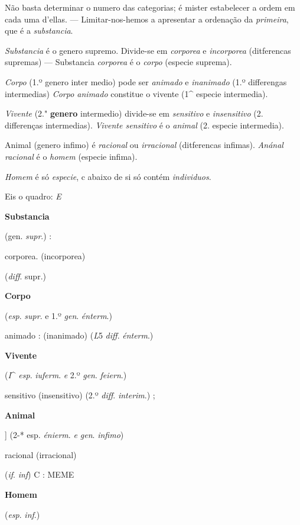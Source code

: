 
 
Não basta determinar o numero das categorias; é mister estabelecer a ordem em cada uma d'ellas. --- Limitar-nos-hemos a apresentar a ordenação da \emph{primeira}, que é a \emph{substancia}.

\emph{Substancia} é o genero supremo. Divide-se em \emph{corporea} e \emph{incorporea} (ditferencas supremas) --- Substancia \emph{corporea} é o \emph{corpo} (especie suprema).

\emph{Corpo} (1.º genero inter medio) pode ser \emph{animado} e \emph{inanimado} (1.º differengas intermedias) \emph{Corpo animado} constitue o vivente (1\textasciicircum{} especie intermedia).

\emph{Vivente} (2." \textbf{genero} intermedio) divide-se em \emph{sensitivo} e \emph{insensitivo} (2. differenças intermedias). \emph{Vivente sensitivo} é o \emph{animal} (2. especie intermedia).

Animal (genero infimo) é \emph{racional} ou \emph{irracional} (ditferencas infimas). \emph{Anánal racional} é o \emph{homem} (especie infima).

\emph{Homem} é só \emph{especie}, c abaixo de si só contém \emph{individuos}.

Eis o quadro: \emph{E}

\textbf{Substancia}

(gen. \emph{supr}.) \textbar{} :

corporea. (incorporea)

(\emph{diff}. supr.)

\textbf{Corpo}

(\emph{esp}. \emph{supr}. e 1.º \emph{gen}. \emph{énterm}.)

animado : (inanimado) (\emph{L}5 \emph{diff}. \emph{énterm}.)

\textbf{Vivente}

(\emph{I}\textasciicircum{} \emph{esp}. \emph{iuferm}. \emph{e} 2.º \emph{gen}. \emph{feiern}.)

sensitivo (insensitivo) (2.º \emph{diff}. \emph{interim}.) ; \textbar{}

\textbar{} \textbf{Animal}

] (2-* esp. \emph{énierm}. \emph{e gen}. \emph{infimo})

racional (irracional)

(\emph{if}. \emph{inf}) C : MEME

\textbf{Homem}

(\emph{esp}. \emph{inf}.)

